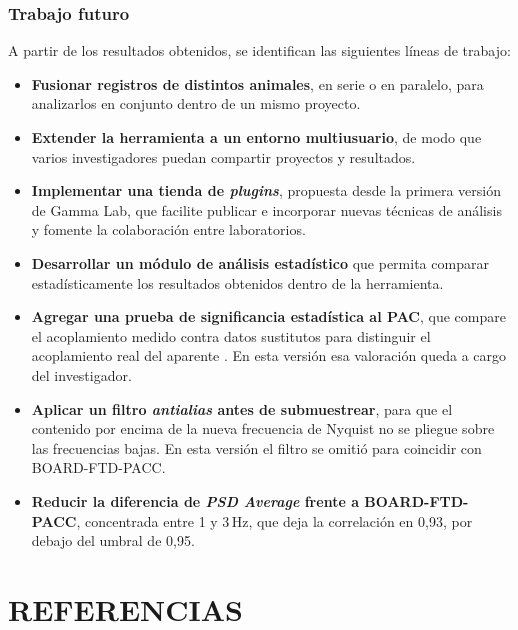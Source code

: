 \documentclass[12pt,letterpaper,oneside]{article}
\newcommand{\capitulo}[1]{\clearpage\section{#1}}
\begin{document}
\subsubsection{Trabajo futuro}

A partir de los resultados obtenidos, se identifican las siguientes líneas de trabajo:

\begin{itemize}
  \item \textbf{Fusionar registros de distintos animales}, en serie o en paralelo, para analizarlos en conjunto dentro de un mismo proyecto.
  \item \textbf{Extender la herramienta a un entorno multiusuario}, de modo que varios investigadores puedan compartir proyectos y resultados.
  \item \textbf{Implementar una tienda de \textit{plugins}}, propuesta desde la primera versión de Gamma Lab, que facilite publicar e incorporar nuevas técnicas de análisis y fomente la colaboración entre laboratorios.
  \item \textbf{Desarrollar un módulo de análisis estadístico} que permita comparar estadísticamente los resultados obtenidos dentro de la herramienta.
  \item \textbf{Agregar una prueba de significancia estadística al PAC}, que compare el acoplamiento medido contra datos sustitutos para distinguir el acoplamiento real del aparente \cite{aru2015}. En esta versión esa valoración queda a cargo del investigador.
  \item \textbf{Aplicar un filtro \textit{antialias} antes de submuestrear}, para que el contenido por encima de la nueva frecuencia de Nyquist no se pliegue sobre las frecuencias bajas. En esta versión el filtro se omitió para coincidir con BOARD-FTD-PACC.
  \item \textbf{Reducir la diferencia de \textit{PSD Average} frente a BOARD-FTD-PACC}, concentrada entre 1 y 3\,Hz, que deja la correlación en 0,93, por debajo del umbral de 0,95.
\end{itemize}

\capitulo{REFERENCIAS}
\end{document}
